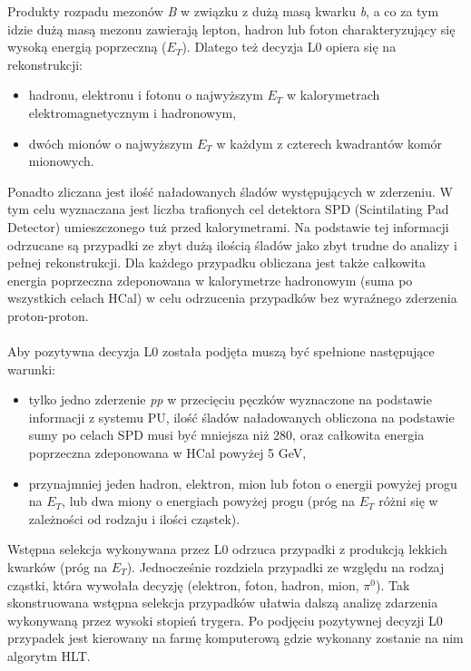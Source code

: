 \documentclass{pracamgr}
\begin{document}
\noindent
Produkty rozpadu mezonów \textit{B} w związku z dużą masą kwarku \textit{b}, a co za tym idzie dużą masą mezonu zawierają lepton, hadron lub foton charakteryzujący się wysoką energią poprzeczną ($E_T$). Dlatego też decyzja L0 opiera się na rekonstrukcji:
\begin{itemize}
 \item hadronu, elektronu i fotonu o najwyższym $E_T$ w kalorymetrach elektromagnetycznym i hadronowym,
 \item dwóch mionów o najwyższym $E_T$ w każdym z czterech kwadrantów komór mionowych.
\end{itemize}

\noindent
Ponadto zliczana jest ilość naładowanych śladów występujących w zderzeniu. W tym celu wyznaczana jest liczba trafionych cel detektora SPD (Scintilating Pad Detector) umieszczonego tuż przed kalorymetrami. Na podstawie tej informacji odrzucane są przypadki ze zbyt dużą ilością śladów jako zbyt trudne do analizy i pełnej rekonstrukcji. Dla każdego przypadku obliczana jest także całkowita energia poprzeczna zdeponowana w kalorymetrze hadronowym (suma po wszystkich celach HCal) w celu odrzucenia przypadków bez wyraźnego zderzenia proton-proton.
\\\\
Aby pozytywna decyzja L0 została podjęta muszą być spełnione następujące warunki:
\begin{itemize}
 \item tylko jedno zderzenie \textit{pp} w przecięciu pęczków wyznaczone na podstawie informacji z systemu PU, ilość śladów naładowanych obliczona na podstawie sumy po celach SPD musi być mniejsza niż 280, oraz całkowita energia poprzeczna zdeponowana w HCal powyżej 5 GeV,
 \item przynajmniej jeden hadron, elektron, mion lub foton o energii powyżej progu na $E_T$, lub dwa miony o energiach powyżej progu (próg na $E_T$ różni się w zależności od rodzaju i ilości cząstek).
\end{itemize}

\noindent
Wstępna selekcja wykonywana przez L0 odrzuca przypadki z produkcją lekkich kwarków (próg na $E_T$). Jednocześnie rozdziela przypadki ze względu na rodzaj cząstki, która wywołała decyzję (elektron, foton, hadron, mion, $\pi^0$). Tak skonstruowana wstępna selekcja przypadków ułatwia dalszą analizę zdarzenia wykonywaną przez wysoki stopień trygera. Po podjęciu pozytywnej decyzji L0 przypadek jest kierowany na farmę komputerową gdzie wykonany zostanie na nim algorytm HLT.
\end{document}
